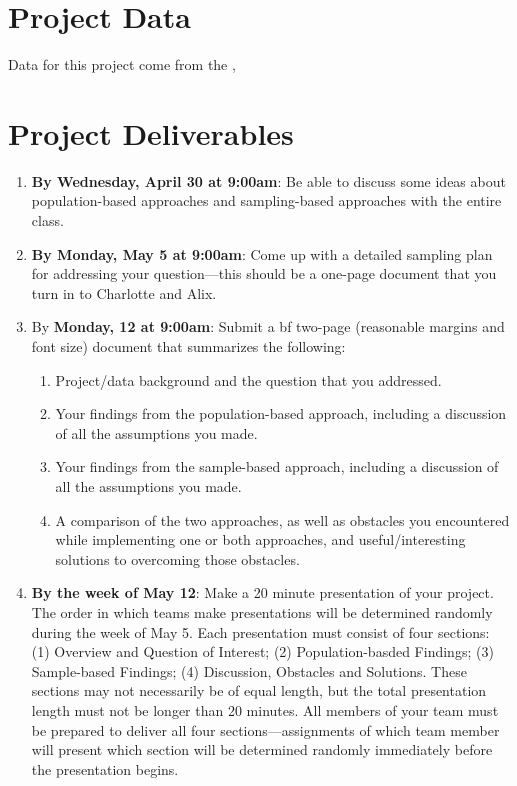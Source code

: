 \documentclass[12pt]{article}
\begin{document}
\section*{Project Data}

Data for this project come from the \textcolor{blue}{ \href{}{}}, 

\section*{Project Deliverables}

\begin{enumerate}

\item {\bf By Wednesday, April 30 at 9:00am}: Be able to discuss some ideas about population-based approaches and sampling-based approaches with the entire class.

\item {\bf By Monday, May 5 at 9:00am}: Come up with a detailed sampling plan for addressing your question---this should be a one-page document that you turn in to Charlotte and Alix. 

\item By {\bf Monday, 12 at 9:00am}: Submit a {bf two-page} (reasonable margins and font size) document that summarizes the following:

\begin{enumerate}
 \item Project/data background and the question that you addressed.
 \item Your findings from the population-based approach, including a discussion of all the assumptions you made.
 \item Your findings from the sample-based approach, including a discussion of all the assumptions you made.
 \item A comparison of the two approaches, as well as obstacles you encountered while implementing one or both approaches, and useful/interesting solutions to overcoming those obstacles.
 \end{enumerate}

\item {\bf By the week of May 12}: Make a 20 minute presentation of your project. The order in which teams make presentations will be determined randomly during the week of May 5. Each presentation must consist of four sections: (1) Overview and Question of Interest; (2) Population-basded Findings; (3) Sample-based Findings; (4) Discussion, Obstacles and Solutions. These sections may not necessarily be of equal length, but the total presentation length must not be longer than 20 minutes. All members of your team must be prepared to deliver all four sections---assignments of which team member will present which section will be determined randomly immediately before the presentation begins.


\end{enumerate}
\end{document}
